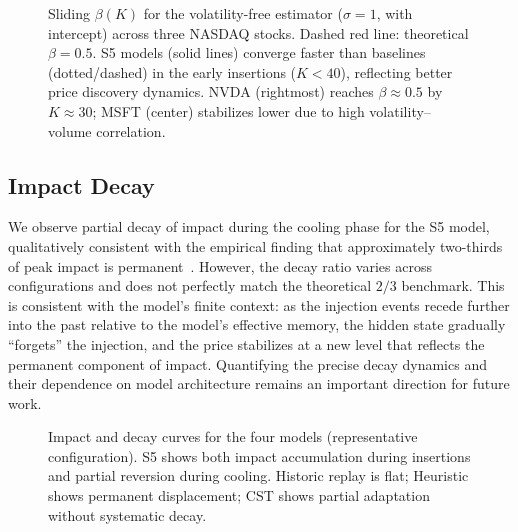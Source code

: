 \documentclass[sigplan,screen,anonymous]{acmart}
\begin{document}
\begin{figure}[t]
  \centering
  \caption{Sliding $\beta(K)$ for the volatility-free estimator ($\sigma=1$, with intercept) across three NASDAQ stocks. Dashed red line: theoretical $\beta = 0.5$. S5 models (solid lines) converge faster than baselines (dotted/dashed) in the early insertions ($K < 40$), reflecting better price discovery dynamics. NVDA (rightmost) reaches $\beta \approx 0.5$ by $K \approx 30$; MSFT (center) stabilizes lower due to high volatility--volume correlation.}
  \label{fig:beta_k_crossstock}
\end{figure}


\subsection{Impact Decay}
\label{sec:decay}

We observe partial decay of impact during the cooling phase for the S5 model, qualitatively consistent with the empirical finding that approximately two-thirds of peak impact is permanent~\cite{bouchaud2018trades}. However, the decay ratio varies across configurations and does not perfectly match the theoretical $2/3$ benchmark. This is consistent with the model's finite context: as the injection events recede further into the past relative to the model's effective memory, the hidden state gradually ``forgets'' the injection, and the price stabilizes at a new level that reflects the permanent component of impact. Quantifying the precise decay dynamics and their dependence on model architecture remains an important direction for future work.

\begin{figure}[t]
  \centering
  \caption{Impact and decay curves for the four models (representative configuration). S5 shows both impact accumulation during insertions and partial reversion during cooling. Historic replay is flat; Heuristic shows permanent displacement; CST shows partial adaptation without systematic decay.}
  \label{fig:decay}
\end{figure}
\end{document}

